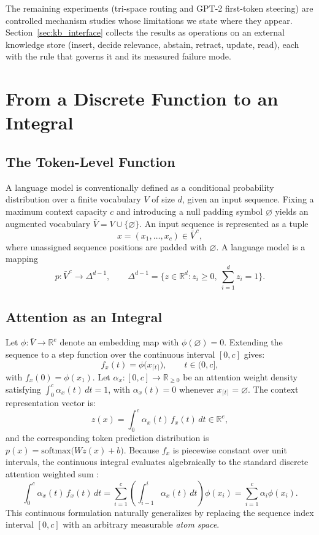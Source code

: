 \documentclass[preprint,12pt]{elsarticle}
\newcommand{\R}{\mathbb{R}}
\newcommand{\V}{V}
\newcommand{\VBar}{\bar{V}}
\newif\ifmarkchanges
\newcommand{\revii}[1]{\ifmarkchanges{\color{blue}#1}\else#1\fi} %
\providecommand{\DIFaddbegin}{} %
\providecommand{\DIFaddend}{} %
\providecommand{\DIFaddincludegraphics}[2][]{{\color{blue}\fbox{\DIFOincludegraphics[#1]{#2}}}} %
\DeclareRobustCommand{\DIFaddbegin}{\DIFOaddbegin \let\includegraphics\DIFaddincludegraphics} %
\DeclareRobustCommand{\DIFaddend}{\DIFOaddend \let\includegraphics\DIFOincludegraphics} %
\begin{document}
The remaining experiments (tri-space routing and GPT-2 first-token steering) are controlled mechanism studies whose limitations we state where they appear. \DIFaddbegin \revii{Section~\ref{sec:kb_interface} collects the results as operations on an external knowledge store (insert, decide relevance, abstain, retract, update, read), each with the rule that governs it and its measured failure mode.}
\DIFaddend 

\section{From a Discrete Function to an Integral}
\label{sec:discrete_to_integral}

\subsection{The Token-Level Function}

A language model is conventionally defined as a conditional probability distribution over a finite vocabulary $\V$ of size $d$, given an input sequence. Fixing a maximum context capacity $c$ and introducing a null padding symbol $\varnothing$ yields an augmented vocabulary $\VBar = \V \cup \{\varnothing\}$. An input sequence is represented as a tuple
\[
  x = (x_1, \dots, x_c) \in \VBar^{\,c},
\]
where unassigned sequence positions are padded with $\varnothing$. A language model is a mapping
\[
  p : \VBar^{\,c} \to \Delta^{d-1}, \qquad
  \Delta^{d-1} = \Big\{ z \in \R^d : z_i \ge 0,\ \sum_{i=1}^d z_i = 1 \Big\}.
\]

\subsection{Attention as an Integral}

Let $\phi : \VBar \to \R^{e}$ denote an embedding map with $\phi(\varnothing) = 0$. Extending the sequence to a step function over the continuous interval $[0,c]$ gives:
\[
  f_x(t) = \phi\big(x_{\lceil t \rceil}\big), \qquad t \in (0,c],
\]
with $f_x(0) = \phi(x_1)$. Let $\alpha_x : [0,c] \to \R_{\ge 0}$ be an attention weight density satisfying $\int_0^c \alpha_x(t)\,dt = 1$, with $\alpha_x(t) = 0$ whenever $x_{\lceil t \rceil} = \varnothing$. The context representation vector is:
\[
  z(x) = \int_0^c \alpha_x(t)\, f_x(t)\, dt \in \R^e,
\]
and the corresponding token prediction distribution is $p(x) = \mathrm{softmax}\big( W z(x) + b \big)$.
Because $f_x$ is piecewise constant over unit intervals, the continuous integral evaluates algebraically to the standard discrete attention weighted sum \cite{vaswani2017attention, martins2020sparse}:
\[
  \int_0^c \alpha_x(t)\, f_x(t)\, dt = \sum_{i=1}^c \left( \int_{i-1}^i \alpha_x(t)\, dt \right) \phi(x_i) = \sum_{i=1}^c \alpha_i \phi(x_i).
\]
This continuous formulation naturally generalizes by replacing the sequence index interval $[0,c]$ with an arbitrary measurable \emph{atom space}.
\end{document}
